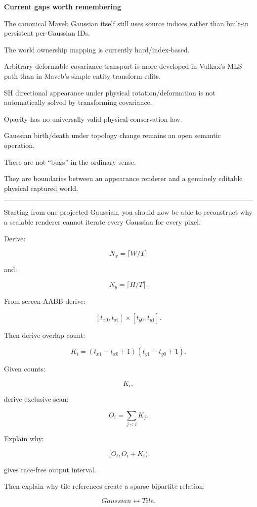 \textbf{Current gaps worth remembering}

The canonical Maveb Gaussian itself still uses source indices rather than built-in persistent per-Gaussian IDs.

The world ownership mapping is currently hard/index-based.

Arbitrary deformable covariance transport is more developed in Vulkax's MLS path than in Maveb's simple entity transform edits.

SH directional appearance under physical rotation/deformation is not automatically solved by transforming covariance.

Opacity has no universally valid physical conservation law.

Gaussian birth/death under topology change remains an open semantic operation.

These are not ``bugs'' in the ordinary sense.

They are boundaries between an appearance renderer and a genuinely editable physical captured world.

\begin{center}\rule{0.5\linewidth}{0.5pt}\end{center}

Starting from one projected Gaussian, you should now be able to reconstruct why a scalable renderer cannot iterate every Gaussian for every pixel.

Derive:

\[
N_x=
\lceil W/T\rceil
\]

and:

\[
N_y=
\lceil H/T\rceil.
\]

From screen AABB derive:

\[
[t_{x0},t_{x1}]
\times
[t_{y0},t_{y1}].
\]

Then derive overlap count:

\[
K_i=
(t_{x1}-t_{x0}+1)
(t_{y1}-t_{y0}+1).
\]

Given counts:

\[
K_i,
\]

derive exclusive scan:

\[
O_i=
\sum_{j<i}K_j.
\]

Explain why:

\[
[O_i,O_i+K_i)
\]

gives race-free output interval.

Then explain why tile references create a sparse bipartite relation:

\[
Gaussian
\leftrightarrow
Tile.
\]

